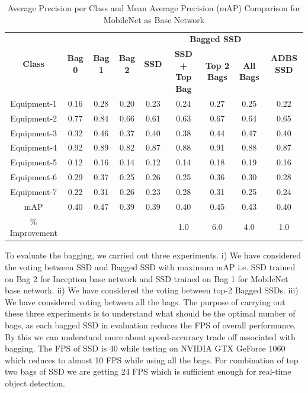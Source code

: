 \documentclass[conference]{IEEEtran}
\begin{document}
\begin{table}
\centering
\caption{Average Precision per Class and Mean Average Precision (mAP) Comparison for MobileNet as Base Network}
\label{mobilenettable}
\begin{tabular}{|c|c|c|c|c|c|c|c|c|}
\hline
\multirow{2}{*}{\textbf{Class}} & \multirow{2}{*}{\textbf{Bag 0}} & \multirow{2}{*}{\textbf{Bag 1}} & \multirow{2}{*}{\textbf{Bag 2}} & \multirow{2}{*}{\textbf{SSD}} & \multicolumn{3}{c|}{\textbf{Bagged SSD}}       & \multirow{2}{*}{\textbf{ADBS SSD}} \\ \cline{6-8}
                       &                        &                        &                        &                      & \textbf{SSD + Top Bag} & \textbf{Top 2 Bags} & \textbf{All Bags} &                           \\ \hline
Equipment-1		& 0.16		& 0.28		& 0.20		& 0.23		& 0.24		& 0.27		& 0.25		& 0.22\\ \hline
Equipment-2		& 0.77		& 0.84		& 0.66		& 0.61		& 0.63		& 0.67		& 0.64		& 0.65\\ \hline
Equipment-3		& 0.32		& 0.46		& 0.37		& 0.40		& 0.38		& 0.44		& 0.47		& 0.40\\ \hline
Equipment-4		& 0.92		& 0.89		& 0.82		& 0.87		& 0.88		& 0.91		& 0.88		& 0.87\\ \hline
Equipment-5		& 0.12		& 0.16		& 0.14		& 0.12		& 0.14		& 0.18		& 0.19		& 0.16\\ \hline
Equipment-6		& 0.29		& 0.37		& 0.25		& 0.26		& 0.25		& 0.36		& 0.30		& 0.28\\ \hline
Equipment-7		& 0.22		& 0.31		& 0.26		& 0.23		& 0.28		& 0.31		& 0.25		& 0.24\\ \hline
mAP				& 0.40		& 0.47		& 0.39		& 0.39		& 0.40		& 0.45		& 0.43		& 0.40\\ \hline
\% Improvement	& \multicolumn{4}{c|}{}							& 1.0		& 6.0		& 4.0		& 1.0\\ \hline
\end{tabular}
\end{table}


To evaluate the bagging, we carried out three experiments. i) We have considered the voting between SSD and Bagged SSD with maximum mAP i.e. SSD trained on Bag 2 for Inception base network and SSD trained on Bag 1 for MobileNet base network. ii) We have considered the voting between top-2 Bagged SSDs. iii) We have considered voting between all the bags. The purpose of carrying out these three experiments is to understand what should be the optimal number of bags, as each bagged SSD in evaluation reduces the FPS of overall performance. By this we can understand more about speed-accuracy trade off associated with bagging. The FPS of SSD is 40 while testing on NVIDIA GTX GeForce 1060 which reduces to almost 10 FPS while using all the bags. For combination of top two bags of SSD we are getting 24 FPS which is sufficient enough for real-time object detection. 
\end{document}
